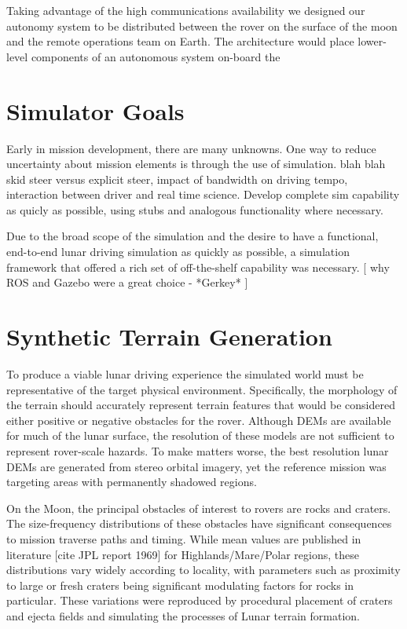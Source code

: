 \documentclass[twocolumn,letterpaper]{IEEEAerospaceCLS}  %
\begin{document}
Taking advantage of the high communications availability we designed our autonomy system to be distributed between the rover on the surface of the moon and the remote operations team on Earth.  The architecture would place lower-level components of an autonomous system on-board the 


\section{Simulator Goals}

Early in mission development, there are many unknowns. One way to reduce uncertainty about mission elements is through the use of simulation. blah blah skid steer versus explicit steer, impact of bandwidth on driving tempo, interaction between driver and real time science. Develop complete sim capability as quicly as possible, using stubs and analogous functionality where necessary. 

Due to the broad scope of the simulation and the desire to have a functional, end-to-end lunar driving simulation as quickly as possible, a simulation framework that offered a rich set of off-the-shelf capability was necessary. [ why ROS and Gazebo were a great choice - *Gerkey* ] 


  
\section{Synthetic Terrain Generation}

To produce a viable lunar driving experience the simulated world must be representative of the target physical environment. Specifically, the morphology of the terrain should accurately represent terrain features that would be considered either positive or negative obstacles for the rover. Although DEMs are available for much of the lunar surface, the resolution of these models are not sufficient to represent rover-scale hazards. To make matters worse, the best resolution lunar DEMs are generated from stereo orbital imagery, yet the reference mission was targeting areas with permanently shadowed regions. 

On the Moon, the principal obstacles of interest to rovers are rocks and craters. The size-frequency distributions of these obstacles have significant consequences to mission traverse paths and timing. While mean values are published in literature [cite JPL report 1969] for Highlands/Mare/Polar regions, these distributions vary widely according to locality, with parameters such as proximity to large or fresh craters being significant modulating factors for rocks in particular. These variations were reproduced by procedural placement of craters and ejecta fields and simulating the processes of Lunar terrain formation. 
\end{document}
